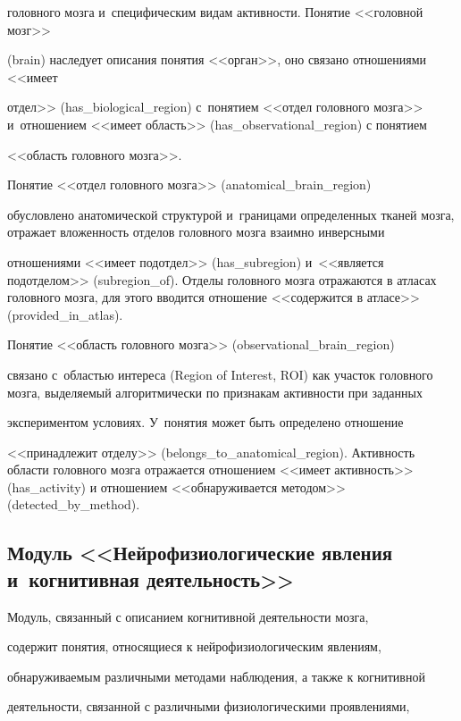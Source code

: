       головного мозга и~специфическим видам активности. Понятие <<головной мозг>> 

      (brain) наследует описания понятия <<орган>>, оно связано отношениями <<имеет

 отдел>> (has\_biological\_region) с~понятием <<отдел головного мозга>> и~отношением <<имеет область>> (has\_observational\_region) с понятием 

<<область головного мозга>>.

      

      Понятие <<отдел головного мозга>> (anatomical\_brain\_region) 

обусловлено анатомической структурой и~границами определенных тканей мозга, отражает вложенность отделов головного мозга взаимно инверсными 

отношениями <<имеет подотдел>> (has\_subregion) и~<<является подотделом>> (subregion\_of). Отделы головного мозга отражаются в атласах головного мозга, для этого вводится отношение <<содержится в атласе>> (provided\_in\_atlas).

       

      Понятие <<область головного мозга>> (observational\_brain\_region) 

связано с~областью интереса (Region of Interest, ROI) как участок головного мозга, выделяемый алгоритмически по признакам активности при заданных 

экспериментом условиях. У~понятия может быть определено отношение 

<<принадлежит отделу>> (belongs\_to\_anatomical\_region). Активность области головного мозга отражается отношением <<имеет активность>> (has\_activity) и отношением <<обнаруживается методом>> (detected\_by\_method).



\subsection{Модуль <<Нейрофизиологические явления и~когнитивная деятельность>>}



      Модуль, связанный с описанием когнитивной деятельности мозга, 

содержит понятия, относящиеся к нейрофизиологическим явлениям, 

обнаруживаемым различными методами наблюдения, а также к когнитивной 

деятельности, связанной с различными физиологическими проявлениями, 

